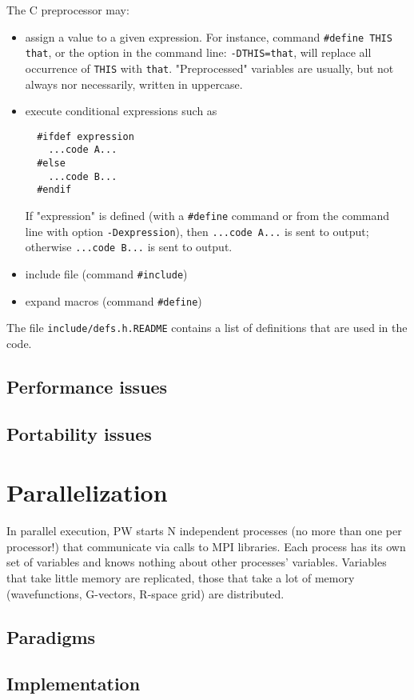 \documentclass[12pt,a4paper]{article}
\begin{document}
The C preprocessor may:
\begin{itemize}
  \item
    assign a value to a given expression. For instance, command
    \texttt{\#define THIS that}, or the option in the command line:
    \texttt{-DTHIS=that}, will replace all occurrence of \texttt{THIS}
    with \texttt{that}.
    "Preprocessed" variables are usually, but not always nor 
    necessarily,  written in uppercase.
  \item
    execute conditional expressions such as
\begin{verbatim}
  #ifdef expression
    ...code A...
  #else
    ...code B...
  #endif
\end{verbatim}
    If "expression" is defined (with a \texttt{\#define} command or
    from the command line with option \texttt{-Dexpression}), then
    \texttt{...code A...} is sent to output; otherwise
    \texttt{...code B...} is sent to output.
  \item
    include file (command \texttt{\#include})
  \item
    expand macros (command \texttt{\#define})
\end{itemize}
The file \texttt{include/defs.h.README} contains a list of definitions
that are used in the code.

\subsection{Performance issues}
\subsection{Portability issues}

\section{Parallelization}

In parallel execution, PW starts N independent
processes (no more than one per processor!)
that communicate via calls to MPI libraries. 
Each process has its own set of variables and knows 
nothing about other processes' variables. Variables 
that take little memory are replicated, those that 
take a lot of memory (wavefunctions, G-vectors, R-space
grid) are distributed.

\subsection{Paradigms}
\subsection{Implementation}
\end{document}
